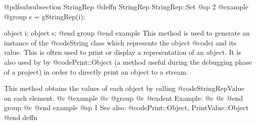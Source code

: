 @pdfsubsubsection {StringRep}
@deffn {StringRep} StringRep::Set
@sp 2
@example
@group
s = gStringRep(i);

object  i;
object  s;
@end group
@end example
This method is used to generate an instance of the @code{String} class
which represents the object @code{i} and its value.  This is often used
to print or display a representation of an object.  It is also used by
by @code{Print::Object} (a method useful during the debugging phase of
a project) in order to directly print an object to a stream.

This method obtains the values of each object by calling
@code{StringRepValue} on each element.
@c @example
@c @group
@c @exdent Example:
@c 
@c @end group
@c @end example
@sp 1
See also:  @code{Print::Object, PrintValue::Object}
@end deffn












